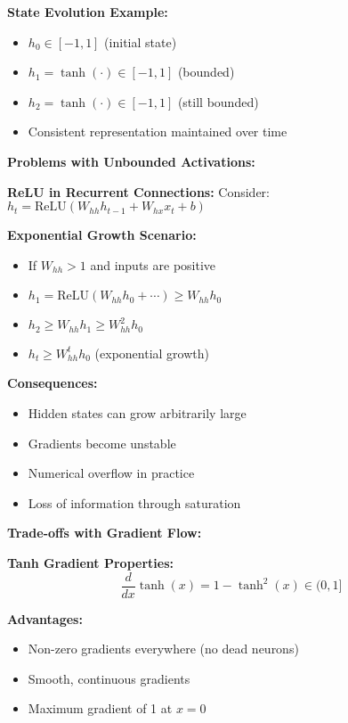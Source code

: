 \documentclass[12pt]{article}
\begin{document}
\begin{enumerate}[(a)]
{    \textbf{State Evolution Example:}
    \begin{itemize}
        \item $h_0 \in [-1, 1]$ (initial state)
        \item $h_1 = \tanh(\cdot) \in [-1, 1]$ (bounded)
        \item $h_2 = \tanh(\cdot) \in [-1, 1]$ (still bounded)
        \item Consistent representation maintained over time
    \end{itemize}
    
    \textbf{Problems with Unbounded Activations:}
    
    \textbf{ReLU in Recurrent Connections:}
    Consider: $h_t = \text{ReLU}(W_{hh} h_{t-1} + W_{hx} x_t + b)$
    
    \textbf{Exponential Growth Scenario:}
    \begin{itemize}
        \item If $W_{hh} > 1$ and inputs are positive
        \item $h_1 = \text{ReLU}(W_{hh} h_0 + \cdots) \geq W_{hh} h_0$
        \item $h_2 \geq W_{hh} h_1 \geq W_{hh}^2 h_0$
        \item $h_t \geq W_{hh}^t h_0$ (exponential growth)
    \end{itemize}
    
    \textbf{Consequences:}
    \begin{itemize}
        \item Hidden states can grow arbitrarily large
        \item Gradients become unstable
        \item Numerical overflow in practice
        \item Loss of information through saturation
    \end{itemize}
    
    \textbf{Trade-offs with Gradient Flow:}
    
    \textbf{Tanh Gradient Properties:}
    $$\frac{d}{dx}\tanh(x) = 1 - \tanh^2(x) \in (0, 1]$$
    
    \textbf{Advantages:}
    \begin{itemize}
        \item Non-zero gradients everywhere (no dead neurons)
        \item Smooth, continuous gradients
        \item Maximum gradient of 1 at $x = 0$
    \end{itemize}
    
}
\end{enumerate}
\end{document}
